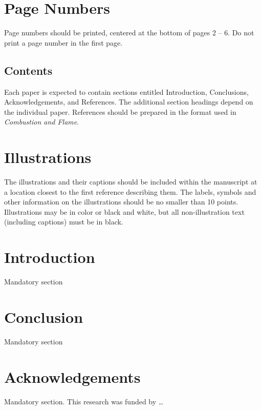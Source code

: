 \documentclass[10pt,a4paper]{ecm}
\begin{document}
\begin{multicols}{2}
\section*{Page Numbers}
Page numbers should be printed, centered at the bottom of pages 2 – 6.
Do not print a page number in the first page.


\subsection*{Contents}
Each paper is expected to contain sections entitled Introduction, Conclusions, Acknowledgements, and References.
The additional section headings depend on the individual paper.
References should be prepared in the format used in {\it Combustion and Flame}.

\section*{Illustrations}
The illustrations and their captions should be included within the manuscript at a location closest to the first reference describing them. 
The labels, symbols and other information on the illustrations should be no smaller than 10 points. 
Illustrations may be in color or black and white, but all non-illustration text (including captions) must be in black.

\section*{Introduction}
Mandatory section

\section*{Conclusion}
Mandatory section

\section*{Acknowledgements}
Mandatory section.
This research was funded by \ldots

\printbibliography

\end{multicols}
\end{document}
